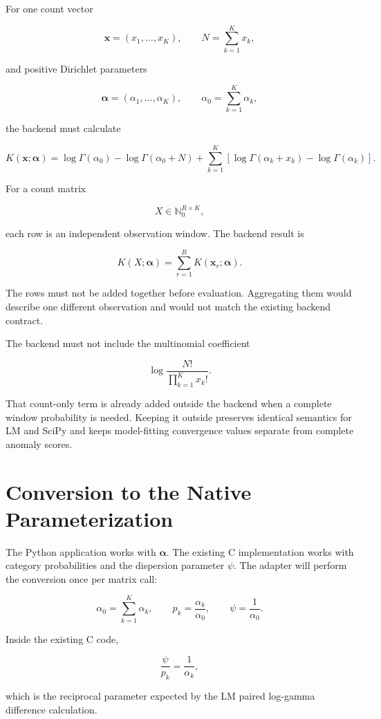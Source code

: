 \documentclass[11pt,a4paper]{article}
\begin{document}
For one count vector

\[
\mathbf{x}=(x_1,\ldots,x_K),
\qquad
N=\sum_{k=1}^{K}x_k,
\]

and positive Dirichlet parameters

\[
\boldsymbol{\alpha}=(\alpha_1,\ldots,\alpha_K),
\qquad
\alpha_0=\sum_{k=1}^{K}\alpha_k,
\]

the backend must calculate

\[
K(\mathbf{x};\boldsymbol{\alpha})
=
\log\Gamma(\alpha_0)
-\log\Gamma(\alpha_0+N)
+\sum_{k=1}^{K}
\left[
\log\Gamma(\alpha_k+x_k)-\log\Gamma(\alpha_k)
\right].
\]

For a count matrix

\[
X\in\mathbb{N}_0^{R\times K},
\]

each row is an independent observation window. The backend result is

\[
K(X;\boldsymbol{\alpha})
=
\sum_{r=1}^{R}K(\mathbf{x}_r;\boldsymbol{\alpha}).
\]

The rows must not be added together before evaluation. Aggregating them would
describe one different observation and would not match the existing backend
contract.

The backend must not include the multinomial coefficient

\[
\log\frac{N!}{\prod_{k=1}^{K}x_k!}.
\]

That count-only term is already added outside the backend when a complete
window probability is needed. Keeping it outside preserves identical semantics
for LM and SciPy and keeps model-fitting convergence values separate from
complete anomaly scores.

\section{Conversion to the Native Parameterization}

The Python application works with \(\boldsymbol{\alpha}\). The existing C
implementation works with category probabilities and the dispersion parameter
\(\psi\). The adapter will perform the conversion once per matrix call:

\[
\alpha_0=\sum_{k=1}^{K}\alpha_k,
\qquad
p_k=\frac{\alpha_k}{\alpha_0},
\qquad
\psi=\frac{1}{\alpha_0}.
\]

Inside the existing C code,

\[
\frac{\psi}{p_k}=\frac{1}{\alpha_k},
\]

which is the reciprocal parameter expected by the LM paired log-gamma
difference calculation.
\end{document}
